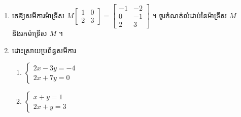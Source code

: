 \begin{enumerate}[1]
\begin{enumerate}[a]
    \item $\begin{bmatrix} 10 & 3\\ -3 & -1 \end{bmatrix}\begin{bmatrix} p\\ q \end{bmatrix} = \begin{bmatrix} 4\\ -1 \end{bmatrix}$
    \item $\begin{bmatrix} 4 & -3\\ 2 & -1 \end{bmatrix}\begin{bmatrix} a\\ -1 \end{bmatrix} = \begin{bmatrix} 15\\ b \end{bmatrix}$
    \item $\begin{bmatrix} -1 & a\\ b & 1 \end{bmatrix}\begin{bmatrix} 2 & -1\\ -1 & 2 \end{bmatrix} = \begin{bmatrix} 1 & 5\\ 3 & 0 \end{bmatrix}$ ។
  \end{enumerate}
  \item គេឱ្យសមីការម៉ាទ្រីស $M\begin{bmatrix} 1 & 0\\ 2 & 3 \end{bmatrix} = \begin{bmatrix} -1 & -2\\ 0 & -1\\ 2 & 3 \end{bmatrix}$ ។ ចូរកំណត់លំដាប់នៃម៉ាទ្រីស $M$ និងរកម៉ាទ្រីស $M$ ។
  \item ដោះស្រាយប្រព័ន្ធសមីការ
  \begin{enumerate}[a]
    \item $\begin{cases} 2x - 3y = -4\\ 2x + 7y = 0 \end{cases}$
    \item $\begin{cases} x + y = 1\\ 2x + y = 3 \end{cases}$

\end{enumerate}
\end{enumerate}
